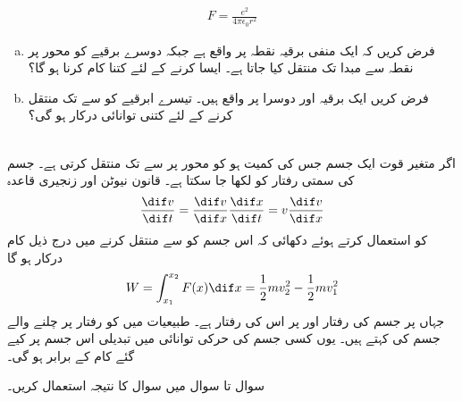   \begin{align*}
F=\frac{e^2}{4\pi\epsilon_0 r^2}
\end{align*}
\begin{enumerate}[a.]
\item
فرض کریں کہ ایک منفی برقیہ نقطہ  پر واقع ہے جبکہ دوسرے برقیے کو محور  پر نقطہ  سے مبدا تک منتقل کیا جاتا ہے۔ ایسا کرنے کے لئے کتنا کام کرنا ہو گا؟
\item
فرض کریں ایک برقیہ   اور دوسرا  پر واقع ہیں۔ تیسرے ابرقیے  کو  سے  تک منتقل کرنے کے لئے کتنی توانائی درکار ہو گی؟
\end{enumerate}
\\
اگر متغیر قوت  ایک جسم جس کی کمیت  ہو کو محور  پر   سے  تک  منتقل کرتی ہے۔ جسم کی سمتی رفتار  کو  لکھا جا سکتا ہے۔ قانون نیوٹن  اور زنجیری قاعدہ
\begin{align*}
\frac{\dif v}{\dif t}=\frac{\dif v}{\dif x}\frac{\dif x}{\dif t}=v\frac{\dif v}{\dif x}
\end{align*}
کو استعمال کرتے ہوئے  دکھائی کہ اس جسم کو  سے  منتقل کرنے میں درج ذیل کام درکار ہو گا
\begin{align*}
W=\int_{x_1}^{x_2} F(x)\dif x=\frac{1}{2}mv_2^2-\frac{1}{2}mv_1^2
\end{align*}
جہاں  پر جسم کی رفتار  اور  پر اس کی رفتار  ہے۔ طبیعیات  میں  کو رفتار  پر چلنے والے جسم کی  کہتے ہیں۔ یوں کسی جسم کی حرکی توانائی میں تبدیلی اس جسم پر کیے گئے کام کے برابر ہو گی۔

سوال  تا سوال  میں سوال  کا نتیجہ استعمال کریں۔

